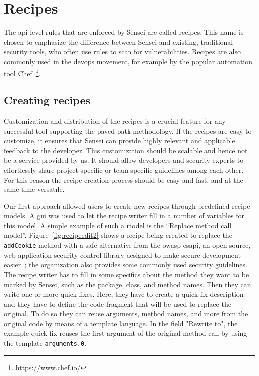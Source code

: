 \section{Recipes}

The \gls{api}-level rules that are enforced by Sensei are called recipes.
This name is chosen to emphasize the difference between Sensei and existing, traditional security tools, who often use rules to scan for vulnerabilities.
Recipes are also commonly used in the \gls{devops} movement, for example by the popular automation tool Chef~\footnote{\url{https://www.chef.io/}}.

\subsection{Creating recipes}
Customization and distribution of the recipes is a crucial feature for any successful tool supporting the paved path methodology.
If the recipes are easy to customize, it ensures that Sensei can provide highly relevant and applicable feedback to the developer.
This customization should be scalable and hence not be a service provided by us.
It should allow developers and security experts to effortlessly share project-specific or team-specific guidelines among each other.
For this reason the recipe creation process should be easy and fast, and at the same time versatile. 

Our first approach allowed users to create new recipes through predefined recipe models.
A \gls{gui} was used to let the recipe writer fill in a number of variables for this model.
A simple example of such a model is  the “Replace method call model”.
Figure~\ref{fig:recipeedit2} shows a recipe being created to replace the \texttt{addCookie} method with a safe alternative from the \gls{owasp} \gls{esapi}, an open source, web application security control library designed to make secure development easier~\cite{ESAPI}; the organization also provides some commonly used security guidelines.
The recipe writer has to fill in some specifics about the method they want to be marked by Sensei, such as the package, class, and method names.
Then they can write one or more quick-fixes.
Here, they have to create a quick-fix description and they have to define the code fragment that will be used to replace the original.
To do so they can reuse arguments, method names, and more from the original code by means of a template language.
In the field "Rewrite to", the example quick-fix reuses the first argument of the original method call by using the template \texttt{arguments.0}. 

